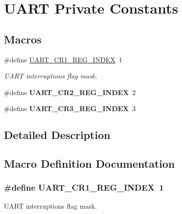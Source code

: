\hypertarget{group___u_a_r_t___private___constants}{}\section{U\+A\+RT Private Constants}
\label{group___u_a_r_t___private___constants}
\subsection*{Macros}
\begin{DoxyCompactItemize}
\item 
\#define \hyperlink{group___u_a_r_t___private___constants_ga5917bcb19b2dab202b8cbfa82520b93e}{U\+A\+R\+T\+\_\+\+C\+R1\+\_\+\+R\+E\+G\+\_\+\+I\+N\+D\+EX}~1
\begin{DoxyCompactList}\small\item\em U\+A\+RT interruptions flag mask. \end{DoxyCompactList}\item 
\#define {\bfseries U\+A\+R\+T\+\_\+\+C\+R2\+\_\+\+R\+E\+G\+\_\+\+I\+N\+D\+EX}~2\hypertarget{group___u_a_r_t___private___constants_ga3a8b0ee44c75493eb001e60a9876e586}{}\label{group___u_a_r_t___private___constants_ga3a8b0ee44c75493eb001e60a9876e586}

\item 
\#define {\bfseries U\+A\+R\+T\+\_\+\+C\+R3\+\_\+\+R\+E\+G\+\_\+\+I\+N\+D\+EX}~3\hypertarget{group___u_a_r_t___private___constants_gac9cb22110b40ab2261468436e3038524}{}\label{group___u_a_r_t___private___constants_gac9cb22110b40ab2261468436e3038524}

\end{DoxyCompactItemize}


\subsection{Detailed Description}


\subsection{Macro Definition Documentation}
\subsubsection[{\texorpdfstring{U\+A\+R\+T\+\_\+\+C\+R1\+\_\+\+R\+E\+G\+\_\+\+I\+N\+D\+EX}{UART_CR1_REG_INDEX}}]{\setlength{\rightskip}{0pt plus 5cm}\#define U\+A\+R\+T\+\_\+\+C\+R1\+\_\+\+R\+E\+G\+\_\+\+I\+N\+D\+EX~1}\hypertarget{group___u_a_r_t___private___constants_ga5917bcb19b2dab202b8cbfa82520b93e}{}\label{group___u_a_r_t___private___constants_ga5917bcb19b2dab202b8cbfa82520b93e}


U\+A\+RT interruptions flag mask. 

